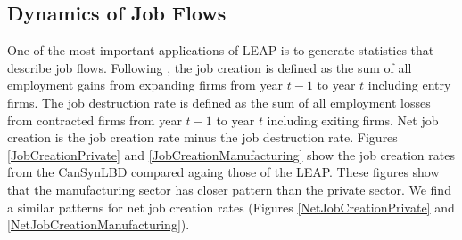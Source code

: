 \documentclass{article}
\begin{document}
\subsection{Dynamics of Job Flows}

One of the most important applications of LEAP is to generate statistics that describe job flows. Following \cite{DavisHaltiwangerSchuh}, the job creation is defined as the sum of all employment gains from expanding firms from year $t-1$ to year $t$ including entry firms. The job destruction rate is defined as the sum of all employment losses from contracted firms from year $t-1$ to year $t$ including exiting firms. Net job creation is the job creation rate minus the job destruction rate. Figures \ref{JobCreationPrivate} and \ref{JobCreationManufacturing} show the job creation rates from the CanSynLBD compared againg those of the LEAP. These figures show that the manufacturing sector has closer pattern than the private sector. We find a similar patterns for net job creation rates (Figures \ref{NetJobCreationPrivate} and  \ref{NetJobCreationManufacturing}).
\end{document}
